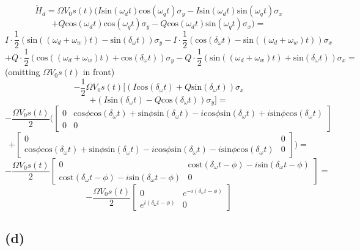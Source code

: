 \documentclass{article}
\begin{document}
$$
\tilde{H}_d=\Omega V_0s(t)(I\text{sin}(\omega_dt)\text{cos}(\omega_qt)\sigma_y
-I\text{sin}(\omega_dt)\text{sin}(\omega_qt)\sigma_x
$$
$$
+Q\text{cos}(\omega_dt)\text{cos}(\omega_qt)\sigma_y
-Q\text{cos}(\omega_dt)\text{sin}(\omega_qt)\sigma_x)=
$$
$$
I\cdot\frac{1}{2}(\text{sin}((\omega_d+\omega_w)t)-\text{sin}(\delta_\omega t))\sigma_y
-I\cdot\frac{1}{2}(\text{cos}(\delta_\omega t)-\text{sin}((\omega_d+\omega_w)t))\sigma_x
$$
$$
+Q\cdot\frac{1}{2}(\text{cos}((\omega_d+\omega_w)t)+\text{cos}(\delta_\omega t))\sigma_y
-Q\cdot\frac{1}{2}(\text{sin}((\omega_d+\omega_w)t)+\text{sin}(\delta_\omega t))\sigma_x=
$$
(omitting $\Omega V_0s(t)$ in front)
$$
-\frac{1}{2}\Omega V_0s(t)[(I\text{cos}(\delta_\omega t)+Q\text{sin}(\delta_\omega t))\sigma_x
$$
$$
+(I\text{sin}(\delta_\omega t)-Q\text{cos}(\delta_\omega t))\sigma_y]=
$$
$$
-\frac{\Omega V_0s(t)}{2}
\biggl(
\begin{bmatrix}
0 & \text{cos}\phi\text{cos}(\delta_\omega t)+\text{sin}\phi\text{sin}(\delta_\omega t)-i\text{cos}\phi\text{sin}(\delta_\omega t)+i\text{sin}\phi\text{cos}(\delta_\omega t)\\
0 & 0
\end{bmatrix}
$$
$$
+\begin{bmatrix}
0 & 0\\
\text{cos}\phi\text{cos}(\delta_\omega t)+\text{sin}\phi\text{sin}(\delta_\omega t)-i\text{cos}\phi\text{sin}(\delta_\omega t)-i\text{sin}\phi\text{cos}(\delta_\omega t) & 0
\end{bmatrix}
\biggr)=
$$
$$
-\frac{\Omega V_0s(t)}{2}
\begin{bmatrix}
0 & \text{cost}(\delta_\omega t-\phi)-i\text{sin}(\delta_\omega t-\phi) \\
\text{cost}(\delta_\omega t-\phi)-i\text{sin}(\delta_\omega t-\phi) & 0
\end{bmatrix}=
$$
$$
\boxed{
-\frac{\Omega V_0s(t)}{2}
\begin{bmatrix}
0 & e^{-i(\delta_\omega t-\phi)} \\
e^{i(\delta_\omega t-\phi)} & 0
\end{bmatrix}
}
$$
\subsection{(d)}
\end{document}
